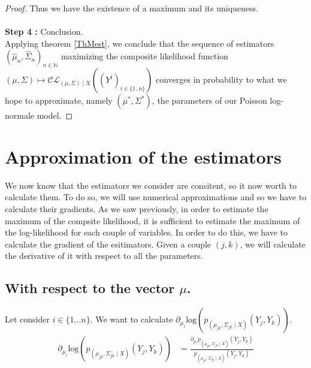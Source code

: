 \documentclass[11pt, a4paper]{article}
\begin{document}
\begin{proof}
Thus we have the existence of a maximum and its uniqueness.\\
\\
\textbf{Step 4 :} Conclusion.\\
Applying theorem \ref{ThMest}, we conclude that the sequence of estimators $(\widehat{\mu}_n, \widehat{\Sigma}_n)_{n \in \mathbb{N}}$ maximizing the composite likelihood function $(\mu,\Sigma) \mapsto \mathcal{CL}_{(\mu,\Sigma) \mid X}((Y^i)_{i \in \{1..n\}})$  converges in probability to what we hope to approximate, namely $(\mu^\ast, \Sigma^\ast)$, the parameters of our Poisson log-normale model.
\end{proof}

\section{Approximation of the estimators}
We now know that the estimators we consider are consitent, so it now worth to calculate them. To do so, we will use numerical approximations and so we have to calculate their gradients. As we saw previously, in order to estimate the maximum of the compsite likelihood, it is sufficient to estimate the maximum of the log-likelihood for each couple of variables. In order to do this, we have to calculate the gradient of the esitimators. Given a couple $(j,k)$, we will calculate the derivative of it with respect to all the parameters.
\subsection{With respect to the vector $\mu$.}
Let consider $i \in \{1...n\}$. We want to calculate $\partial_{\mu_i}\mathrm{log}( p_{(\mu_{jk},\Sigma_{jk} \mid X)}(Y_j,Y_k))$.
\begin{align*}
\partial_{\mu_i}\mathrm{log}( p_{(\mu_{jk},\Sigma_{jk} \mid X)}(Y_j,Y_k)) &= \frac{\partial_{\mu_i}p_{(\mu_{jk},\Sigma_{jk} \mid X)}(Y_j,Y_k) }{p_{(\mu_{jk},\Sigma_{jk} \mid X)}(Y_j,Y_k)}
\end{align*}
\end{document}
